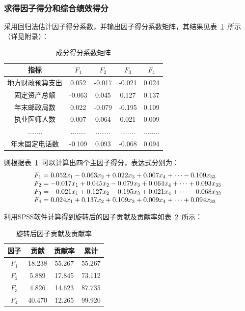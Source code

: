 \documentclass{whutmod}
\begin{document}
\begin{itemize}
	\subsubsection{求得因子得分和综合绩效得分}
	采用回归法估计因子得分系数，并输出因子得分系数矩阵，其结果见表~\ref{defenyinzi}~所示（详见附录）：
				\begin{table}[H]
		\centering
		\caption{成分得分系数矩阵}\label{defenyinzi}
		\begin{tabular}{ccccc}
			\toprule[2pt]
			\multicolumn{1}{m{2cm}}{\centering 指标} &
			\multicolumn{1}{m{1cm}}{\centering $F_{1}$} & \multicolumn{1}{m{1cm}}{\centering $F_{2}$} & \multicolumn{1}{m{1cm}}{\centering $F_{3}$}&
			\multicolumn{1}{m{1cm}}{\centering $F_{4}$}\\
			\midrule[1pt]
			地方财政预算支出&0.052 & -0.017 & -0.021&0.024\\ 
			固定资产总额&-0.063 & 0.045 &0.127&0.137\\ 
			年末邮政局数&0.022 &-0.079  &-0.195&0.109\\ 
			执业医师人数&0.007 &0.064 &0.021 &0.009\\ 
			........& ........&  ........ &........ &........ \\ 
			年末固定电话数&-0.109 &0.093 &-0.068 &0.094 \\
			\bottomrule[2pt]
		\end{tabular}
	\end{table}
	则根据表~\ref{defenyinzi}~可以计算出四个主因子得分，表达式分别为：
	\begin{gather}
	\begin{matrix}
	F_{1}=0.052x_{1}-0.063x_{2}+0.022x_{3}+0.007x_{4}+\cdots-0.109x_{33}\hfill\\ 
	F_{2}=-0.017x_{1}+0.045x_{2}-0.079x_{3}+0.064x_{4}+\cdots+0.093x_{33}\hfill\\ 
	F_{3}=-0.021x_{1}+0.127x_{2}-0.195x_{3}+0.021x_{4}+\cdots-0.068x_{33}\hfill\\ 
	F_{4}=0.024x_{1}+0.137x_{2}+0.109x_{3}+0.009x_{4}+\cdots+0.094x_{33}\hfill
	\end{matrix}
	\end{gather}
	
	利用SPSS软件计算得到旋转后的因子贡献及贡献率如表~\ref{fff}~所示：
			\begin{table}[H]
	\centering
	\caption{旋转后因子贡献及贡献率}\label{fff}
	\begin{tabular}{cccc}
		\toprule[2pt]
		\multicolumn{1}{m{2cm}}{\centering 因子}&
		\multicolumn{1}{m{2cm}}{\centering 贡献} & \multicolumn{1}{m{2cm}}{\centering 贡献率} & \multicolumn{1}{m{2cm}}{\centering 累计}\\
		\midrule[1pt]
		$F_{1}$	 &  18.238 & 55.267&55.267\\ 
		$F_{2}$ &  5.889 & 17.845&73.112\\ 
		$F_{3}$	 &  4.826 &14.623&87.735\\ 
		$F_{4}$  &  40.470& 12.265&99.920\\ 
		\bottomrule[2pt]
	\end{tabular}
\end{table}
	

\end{itemize}
\end{document}

